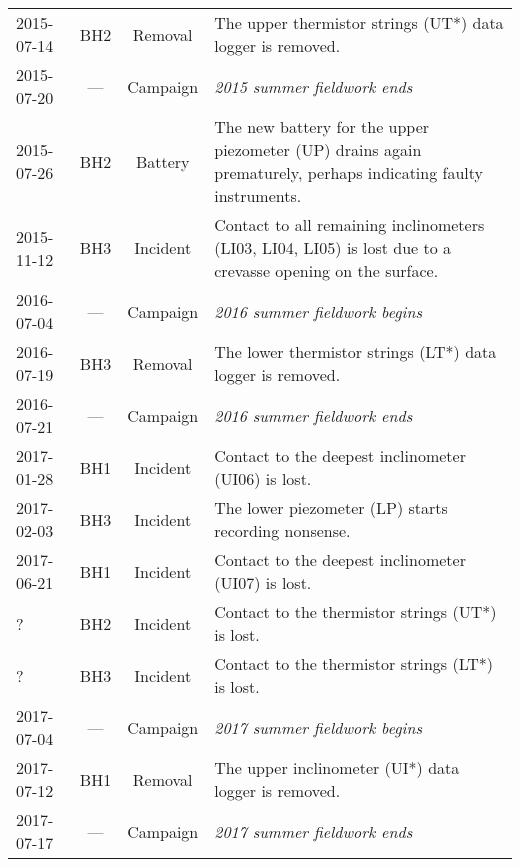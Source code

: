\documentclass[utf8]{article}
\begin{document}
\begin{table}
{\begin{tabular}{lccp{95mm}}
        2015-07-14 & BH2  & Removal  & The upper thermistor strings (UT*) data
                                       logger is removed. \\
        2015-07-20 & ---  & Campaign & \emph{2015 summer fieldwork ends} \\
        \hline
        2015-07-26 & BH2  & Battery  & The new battery for the upper piezometer
                                       (UP) drains again prematurely, perhaps
                                       indicating faulty instruments. \\
        2015-11-12 & BH3  & Incident & Contact to all remaining inclinometers
                                       (LI03, LI04, LI05) is lost due to
                                       a crevasse opening on the surface. \\
        \hline
        2016-07-04 & ---  & Campaign & \emph{2016 summer fieldwork begins} \\
        2016-07-19 & BH3  & Removal  & The lower thermistor strings (LT*) data
                                       logger is removed. \\
        2016-07-21 & ---  & Campaign & \emph{2016 summer fieldwork ends} \\
        \hline
        2017-01-28 & BH1  & Incident & Contact to the deepest inclinometer
                                       (UI06) is lost. \\
        2017-02-03 & BH3  & Incident & The lower piezometer (LP) starts
                                       recording nonsense. \\
        2017-06-21 & BH1  & Incident & Contact to the deepest inclinometer
                                       (UI07) is lost. \\
        ?          & BH2  & Incident & Contact to the thermistor strings (UT*)
                                       is lost. \\
        ?          & BH3  & Incident & Contact to the thermistor strings (LT*)
                                       is lost. \\
        \hline
        2017-07-04 & ---  & Campaign & \emph{2017 summer fieldwork begins} \\
        2017-07-12 & BH1  & Removal  & The upper inclinometer (UI*) data logger
                                       is removed. \\
        2017-07-17 & ---  & Campaign & \emph{2017 summer fieldwork ends} \\
        \hline
      \end{tabular}}
    \end{table}
\end{document}
